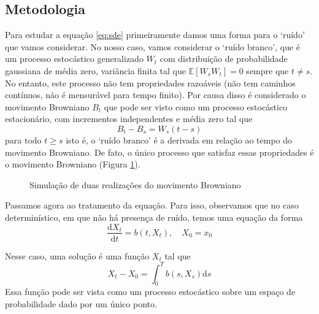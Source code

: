 \documentclass[portrait]{a0poster}	%
\theoremstyle{definition}
\begin{document}
\begin{multicols}{2}
    \section*{Metodologia}

    Para estudar a equação \eqref{eq:sde} primeiramente damos uma forma para o `ruído' que vamos considerar. No nosso caso, vamos considerar o `ruído branco', que é um processo estocástico generalizado $W_t$ com distribuição de probabilidade gaussiana de média zero, variância finita tal que $\mathbb{E}[W_sW_t]=0$ sempre que $t\neq s$. No entanto, este processo não tem propriedades razoáveis (não tem caminhos contínuos, não é mensurável para tempo finito). Por causa disso é considerado o movimento Browniano $B_t$ que pode ser visto como um processo estocástico estacionário, com incrementos independentes e média zero tal que 
    \[
    B_t-B_s=W_s(t-s)
    \]
    para todo $t\geq s$ isto é, o `ruído branco' é a derivada em relação ao tempo do movimento Browniano. De fato, o único processo que satisfaz essas propriedades é o movimento Browniano (Figura \ref{fig:brownian_motion}). 

    \begin{figure}[h!]
    \centering
    \caption{Simulação de duas realizações do movimento Browniano \cite{texexchange:brownian-tikz}}
    \label{fig:brownian_motion}
    \end{figure}

    Passamos agora ao tratamento da equação. Para isso, observamos que no caso determinístico, em que não há presença de ruído, temos uma equação da forma
    \begin{equation}
        \frac{\mathrm{d} X_t}{\mathrm{d} t} = b(t, X_t), \quad X_0 = x_0
    \end{equation}

    Nesse caso, uma solução é uma função $X_t$ tal que
    \begin{equation}
        X_t - X_0 = \int_0^T b(s, X_s) \mathrm{d}s
    \end{equation}
    Essa função pode ser vista como um processo estocástico sobre um espaço de probabilidade dado por um único ponto. 


\end{multicols}
\end{document}
